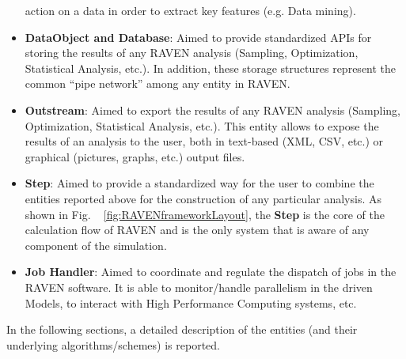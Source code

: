 \begin{itemize}
action on a data in order to extract key features (e.g. Data mining).
\item 	\textbf{DataObject and Database}: Aimed to provide standardized APIs for storing the results of any RAVEN analysis 
(Sampling, Optimization, Statistical Analysis, etc.). In addition, these storage structures represent the common ``pipe 
network'' among any entity in RAVEN.
\item 	\textbf{Outstream}: Aimed to export the results of any RAVEN analysis (Sampling, 
Optimization, Statistical Analysis, etc.). This entity allows to expose the results of an analysis to the user, both in text-based (XML, CSV, etc.) or graphical (pictures, graphs, etc.) output files.
\item 	\textbf{Step}: Aimed to provide a standardized way for the user to combine the entities reported above for the construction of any particular analysis. As shown in Fig. ~ \ref{fig:RAVENframeworkLayout}, the \textbf{Step} is the core 
of the calculation flow of RAVEN and is the only system that is aware of any component of the simulation.
\item	\textbf{Job Handler}: Aimed to coordinate and regulate the dispatch of jobs in the RAVEN software. It is able to monitor/handle parallelism in the driven Models, to interact with High Performance Computing systems, etc.
\end{itemize}
In the following sections, a detailed description of the entities (and their underlying algorithms/schemes) is reported.

